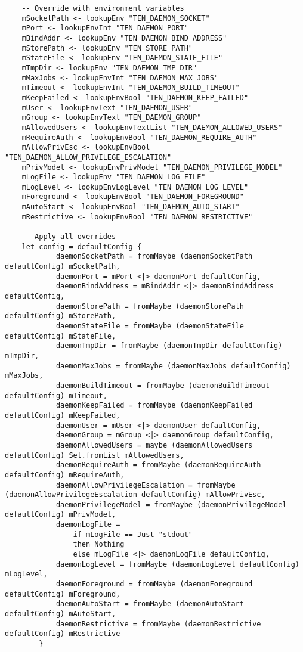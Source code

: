 \documentclass{article}
\begin{document}
\begin{tcolorbox}[title=Ten/Daemon/Config.hs Changes]
\begin{verbatim}
    -- Override with environment variables
    mSocketPath <- lookupEnv "TEN_DAEMON_SOCKET"
    mPort <- lookupEnvInt "TEN_DAEMON_PORT"
    mBindAddr <- lookupEnv "TEN_DAEMON_BIND_ADDRESS"
    mStorePath <- lookupEnv "TEN_STORE_PATH"
    mStateFile <- lookupEnv "TEN_DAEMON_STATE_FILE"
    mTmpDir <- lookupEnv "TEN_DAEMON_TMP_DIR"
    mMaxJobs <- lookupEnvInt "TEN_DAEMON_MAX_JOBS"
    mTimeout <- lookupEnvInt "TEN_DAEMON_BUILD_TIMEOUT"
    mKeepFailed <- lookupEnvBool "TEN_DAEMON_KEEP_FAILED"
    mUser <- lookupEnvText "TEN_DAEMON_USER"
    mGroup <- lookupEnvText "TEN_DAEMON_GROUP"
    mAllowedUsers <- lookupEnvTextList "TEN_DAEMON_ALLOWED_USERS"
    mRequireAuth <- lookupEnvBool "TEN_DAEMON_REQUIRE_AUTH"
    mAllowPrivEsc <- lookupEnvBool "TEN_DAEMON_ALLOW_PRIVILEGE_ESCALATION"
    mPrivModel <- lookupEnvPrivModel "TEN_DAEMON_PRIVILEGE_MODEL"
    mLogFile <- lookupEnv "TEN_DAEMON_LOG_FILE"
    mLogLevel <- lookupEnvLogLevel "TEN_DAEMON_LOG_LEVEL"
    mForeground <- lookupEnvBool "TEN_DAEMON_FOREGROUND"
    mAutoStart <- lookupEnvBool "TEN_DAEMON_AUTO_START"
    mRestrictive <- lookupEnvBool "TEN_DAEMON_RESTRICTIVE"

    -- Apply all overrides
    let config = defaultConfig {
            daemonSocketPath = fromMaybe (daemonSocketPath defaultConfig) mSocketPath,
            daemonPort = mPort <|> daemonPort defaultConfig,
            daemonBindAddress = mBindAddr <|> daemonBindAddress defaultConfig,
            daemonStorePath = fromMaybe (daemonStorePath defaultConfig) mStorePath,
            daemonStateFile = fromMaybe (daemonStateFile defaultConfig) mStateFile,
            daemonTmpDir = fromMaybe (daemonTmpDir defaultConfig) mTmpDir,
            daemonMaxJobs = fromMaybe (daemonMaxJobs defaultConfig) mMaxJobs,
            daemonBuildTimeout = fromMaybe (daemonBuildTimeout defaultConfig) mTimeout,
            daemonKeepFailed = fromMaybe (daemonKeepFailed defaultConfig) mKeepFailed,
            daemonUser = mUser <|> daemonUser defaultConfig,
            daemonGroup = mGroup <|> daemonGroup defaultConfig,
            daemonAllowedUsers = maybe (daemonAllowedUsers defaultConfig) Set.fromList mAllowedUsers,
            daemonRequireAuth = fromMaybe (daemonRequireAuth defaultConfig) mRequireAuth,
            daemonAllowPrivilegeEscalation = fromMaybe (daemonAllowPrivilegeEscalation defaultConfig) mAllowPrivEsc,
            daemonPrivilegeModel = fromMaybe (daemonPrivilegeModel defaultConfig) mPrivModel,
            daemonLogFile =
                if mLogFile == Just "stdout"
                then Nothing
                else mLogFile <|> daemonLogFile defaultConfig,
            daemonLogLevel = fromMaybe (daemonLogLevel defaultConfig) mLogLevel,
            daemonForeground = fromMaybe (daemonForeground defaultConfig) mForeground,
            daemonAutoStart = fromMaybe (daemonAutoStart defaultConfig) mAutoStart,
            daemonRestrictive = fromMaybe (daemonRestrictive defaultConfig) mRestrictive
        }


\end{verbatim}
\end{tcolorbox}
\end{document}
